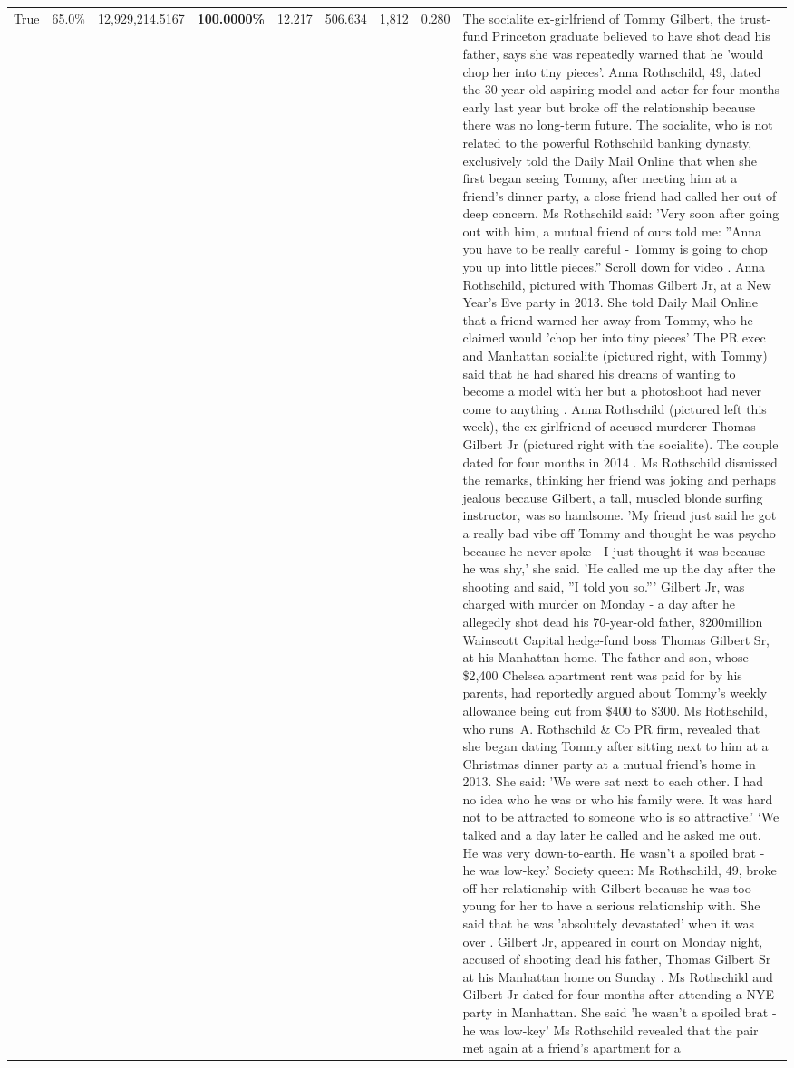 \begin{table}[H]
\begin{tabular}{lllrlllll}
True & 65.0\% & 12,929,214.5167 & \bfseries \color{red} 100.0000\% & 12.217 & 506.634 & 1,812 & 0.280 & The socialite ex-girlfriend of Tommy Gilbert, the trust-fund Princeton graduate believed to have shot dead his father, says she was repeatedly warned that he 'would chop her into tiny pieces'. Anna Rothschild, 49, dated the 30-year-old aspiring model and actor for four months early last year but broke off the relationship because there was no long-term future. The socialite, who is not related to the powerful Rothschild banking dynasty, exclusively told the Daily Mail Online that when she first began seeing Tommy, after meeting him at a friend's dinner party, a close friend had called her out of deep concern. Ms Rothschild said: 'Very soon after going out with him, a mutual friend of ours told me: ''Anna you have to be really careful - Tommy is going to chop you up into little pieces.'' Scroll down for video . Anna Rothschild, pictured with Thomas Gilbert Jr, at a New Year's Eve party in 2013. She told Daily Mail Online that a friend warned her away from Tommy, who he claimed would 'chop her into tiny pieces' The PR exec and Manhattan socialite (pictured right, with Tommy) said that he had shared his dreams of wanting to become a model with her but a photoshoot had never come to anything . Anna Rothschild (pictured left this week), the ex-girlfriend of accused murderer Thomas Gilbert Jr (pictured right with the socialite). The couple dated for four months in 2014 . Ms Rothschild dismissed the remarks, thinking her friend was joking and perhaps jealous because Gilbert, a tall, muscled blonde surfing instructor, was so handsome. 'My friend just said he got a really bad vibe off Tommy and thought he was psycho because he never spoke - I just thought it was because he was shy,' she said. 'He called me up the day after the shooting and said, ''I told you so.''' Gilbert Jr, was charged with murder on Monday - a day after he allegedly shot dead his 70-year-old father, \$200million Wainscott Capital hedge-fund boss Thomas Gilbert Sr, at his Manhattan home. The father and son, whose \$2,400 Chelsea apartment rent was paid for by his parents, had reportedly argued about Tommy's weekly allowance being cut from \$400 to \$300. Ms Rothschild, who runs A. Rothschild \& Co PR firm, revealed that she began dating Tommy after sitting next to him at a Christmas dinner party at a mutual friend's home in 2013. She said: 'We were sat next to each other. I had no idea who he was or who his family were. It was hard not to be attracted to someone who is so attractive.' ‘We talked and a day later he called and he asked me out. He was very down-to-earth. He wasn’t a spoiled brat - he was low-key.’ Society queen: Ms Rothschild, 49, broke off her relationship with Gilbert because he was too young for her to have a serious relationship with. She said that he was 'absolutely devastated' when it was over . Gilbert Jr, appeared in court on Monday night, accused of shooting dead his father, Thomas Gilbert Sr at his Manhattan home on Sunday . Ms Rothschild and Gilbert Jr dated for four months after attending a NYE party in Manhattan. She said 'he wasn't a spoiled brat - he was low-key' Ms Rothschild revealed that the pair met again at a friend’s apartment for a 
\end{tabular}
\end{table}
